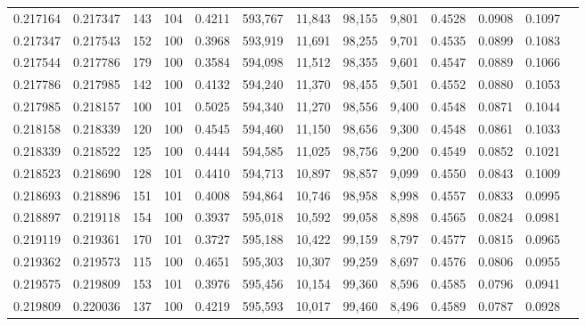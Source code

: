 \begin{tabular}{rrrrrrrrrrrrr}
0.217164 & 0.217347 &   143 & 104 &                                     0.4211 & 593,767 &  11,843 &  98,155 &   9,801 & 0.4528 & 0.0908 & 0.1097 \\
0.217347 & 0.217543 &   152 & 100 &                                     0.3968 & 593,919 &  11,691 &  98,255 &   9,701 & 0.4535 & 0.0899 & 0.1083 \\
0.217544 & 0.217786 &   179 & 100 &                                     0.3584 & 594,098 &  11,512 &  98,355 &   9,601 & 0.4547 & 0.0889 & 0.1066 \\
0.217786 & 0.217985 &   142 & 100 &                                     0.4132 & 594,240 &  11,370 &  98,455 &   9,501 & 0.4552 & 0.0880 & 0.1053 \\
0.217985 & 0.218157 &   100 & 101 &                                     0.5025 & 594,340 &  11,270 &  98,556 &   9,400 & 0.4548 & 0.0871 & 0.1044 \\
0.218158 & 0.218339 &   120 & 100 &                                     0.4545 & 594,460 &  11,150 &  98,656 &   9,300 & 0.4548 & 0.0861 & 0.1033 \\
0.218339 & 0.218522 &   125 & 100 &                                     0.4444 & 594,585 &  11,025 &  98,756 &   9,200 & 0.4549 & 0.0852 & 0.1021 \\
0.218523 & 0.218690 &   128 & 101 &                                     0.4410 & 594,713 &  10,897 &  98,857 &   9,099 & 0.4550 & 0.0843 & 0.1009 \\
0.218693 & 0.218896 &   151 & 101 &                                     0.4008 & 594,864 &  10,746 &  98,958 &   8,998 & 0.4557 & 0.0833 & 0.0995 \\
0.218897 & 0.219118 &   154 & 100 &                                     0.3937 & 595,018 &  10,592 &  99,058 &   8,898 & 0.4565 & 0.0824 & 0.0981 \\
0.219119 & 0.219361 &   170 & 101 &                                     0.3727 & 595,188 &  10,422 &  99,159 &   8,797 & 0.4577 & 0.0815 & 0.0965 \\
0.219362 & 0.219573 &   115 & 100 &                                     0.4651 & 595,303 &  10,307 &  99,259 &   8,697 & 0.4576 & 0.0806 & 0.0955 \\
0.219575 & 0.219809 &   153 & 101 &                                     0.3976 & 595,456 &  10,154 &  99,360 &   8,596 & 0.4585 & 0.0796 & 0.0941 \\
0.219809 & 0.220036 &   137 & 100 &                                     0.4219 & 595,593 &  10,017 &  99,460 &   8,496 & 0.4589 & 0.0787 & 0.0928 \\

\end{tabular}
